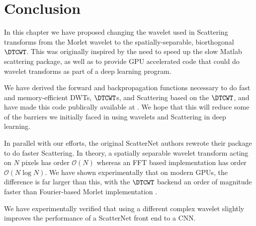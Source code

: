 \section{Conclusion}
In this chapter we have proposed changing the wavelet used in Scattering transforms
from the Morlet wavelet to the spatially-separable, biorthogonal $\DTCWT$. This was
originally inspired by the need to speed up the slow Matlab scattering package,
as well as to provide GPU accelerated code that could do wavelet transforms as part
of a deep learning program.

We have derived the forward and backpropagation functions necessary to do 
fast and memory-efficient DWTs, $\DTCWT$s, and Scattering based on the $\DTCWT$, 
and have made this code publically available at \cite{cotter_pytorch_2018}. We
hope that this will reduce some of the barriers we initially faced in using wavelets and
Scattering in deep learning.

In parallel with our efforts, the original ScatterNet authors rewrote their
package to do faster Scattering. In theory, a spatially separable wavelet
transform acting on $N$ pixels has order $\mathcal{O}(N)$ whereas an FFT based
implementation has order $\mathcal{O}(N \log N)$. We have shown experimentally
that on modern GPUs, the difference is far larger than this, with the $\DTCWT$
backend an order of magnitude faster than Fourier-based Morlet implementation
\cite{andreux_kymatio:_2018}.

We have experimentally verified that using a different complex
wavelet slightly improves the performance of a ScatterNet front end to a
CNN.
